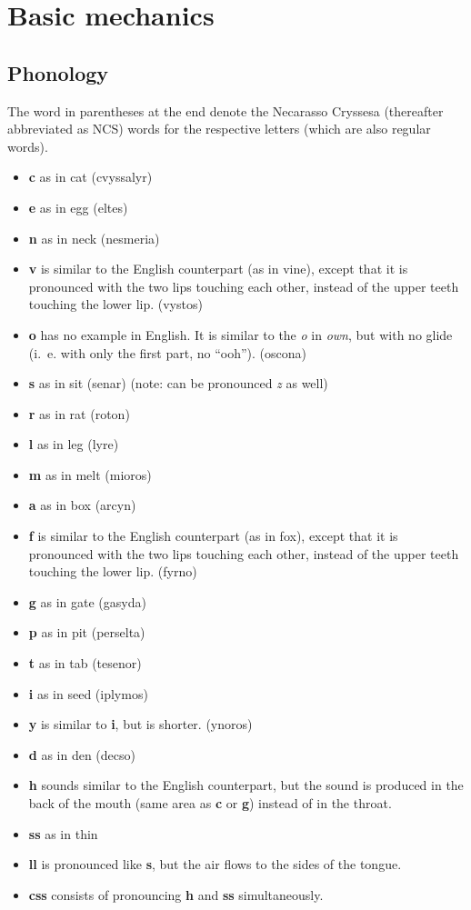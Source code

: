 \chapter{Basic mechanics}

\newcommand{\shp}[3]{\item \textbf{#1} as in #2 (#3)}

\section{Phonology}

The word in parentheses at the end denote the Necarasso Cryssesa (thereafter abbreviated as NCS) words for the respective letters (which are also regular words).

\begin{itemize}
  \shp{c}{cat}{cvyssalyr}
  \shp{e}{egg}{eltes}
  \shp{n}{neck}{nesmeria}
  \item \textbf{v} is similar to the English counterpart (as in vine), except that it is pronounced with the two lips touching each other, instead of the upper teeth touching the lower lip. (vystos)
  \item \textbf{o} has no example in English. It is similar to the \emph{o} in \emph{own}, but with no glide (i.~e. with only the first part, no ``ooh''). (oscona)
  \shp{s}{sit}{senar} (note: can be pronounced \emph{z} as well)
  \shp{r}{rat}{roton}
  \shp{l}{leg}{lyre}
  \shp{m}{melt}{mioros}
  \shp{a}{box}{arcyn}
  \item \textbf{f} is similar to the English counterpart (as in fox), except that it is pronounced with the two lips touching each other, instead of the upper teeth touching the lower lip. (fyrno)
  \shp{g}{gate}{gasyda}
  \shp{p}{pit}{perselta}
  \shp{t}{tab}{tesenor}
  \shp{i}{seed}{iplymos}
  \item \textbf{y} is similar to \textbf{i}, but is shorter. (ynoros)
  \shp{d}{den}{decso}
  \item \textbf{h} sounds similar to the English counterpart, but the sound is produced in the back of the mouth (same area as \textbf{c} or \textbf{g}) instead of in the throat.
  \item \textbf{ss} as in thin
  \item \textbf{ll} is pronounced like \textbf{s}, but the air flows to the sides of the tongue.
  \item \textbf{css} consists of pronouncing \textbf{h} and \textbf{ss} simultaneously.
\end{itemize}

